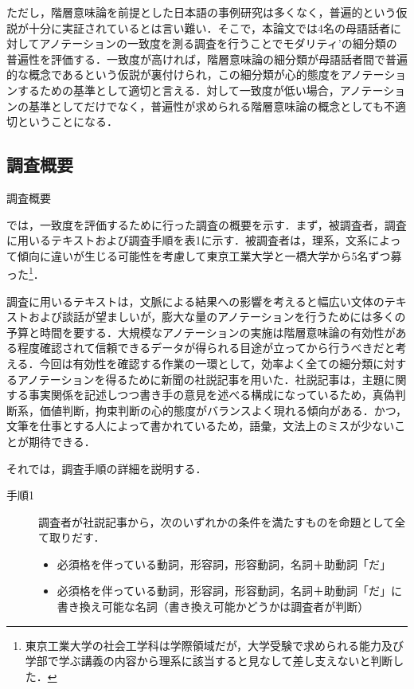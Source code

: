 \documentclass[japanese]{jnlp_1.4}
\begin{document}
ただし，階層意味論を前提とした日本語の事例研究は多くなく，普遍的という仮説が十分に実証されているとは言い難い．そこで，本論文では4名の母語話者に対してアノテーションの一致度を測る調査を行うことでモダリティ’の細分類の普遍性を評価する．一致度が高ければ，階層意味論の細分類が母語話者間で普遍的な概念であるという仮説が裏付けられ，この細分類が心的態度をアノテーションするための基準として適切と言える．対して一致度が低い場合，アノテーションの基準としてだけでなく，普遍性が求められる階層意味論の概念としても不適切ということになる．


\subsection{調査概要}

\begin{table}[b]
\caption{調査概要}

\end{table}

では，一致度を評価するために行った調査の概要を示す．まず，被調査者，調査に用いるテキストおよび調査手順を表1に示す．被調査者は，理系，文系によって傾向に違いが生じる可能性を考慮して東京工業大学と一橋大学から5名ずつ募った\footnote{東京工業大学の社会工学科は学際領域だが，大学受験で求められる能力及び学部で学ぶ講義の内容から理系に該当すると見なして差し支えないと判断した．}．

調査に用いるテキストは，文脈による結果への影響を考えると幅広い文体のテキストおよび談話が望ましいが，膨大な量のアノテーションを行うためには多くの予算と時間を要する．大規模なアノテーションの実施は階層意味論の有効性がある程度確認されて信頼できるデータが得られる目途が立ってから行うべきだと考える．今回は有効性を確認する作業の一環として，効率よく全ての細分類に対するアノテーションを得るために新聞の社説記事を用いた．社説記事は，主題に関する事実関係を記述しつつ書き手の意見を述べる構成になっているため，真偽判断系，価値判断，拘束判断の心的態度がバランスよく現れる傾向がある．かつ，文筆を仕事とする人によって書かれているため，語彙，文法上のミスが少ないことが期待できる．



それでは，調査手順の詳細を説明する．
\begin{description}
\item[手順1] \gt 調査者が社説記事から，次のいずれかの条件を満たすものを命題として全て取りだす．
	\begin{itemize}
	\item 必須格を伴っている動詞，形容詞，形容動詞，名詞＋助動詞「だ」
	\item 必須格を伴っている動詞，形容詞，形容動詞，名詞＋助動詞「だ」に書き換え可能な名詞（書き換え可能かどうかは調査者が判断）
	\end{itemize}
\end{description}
\end{document}
